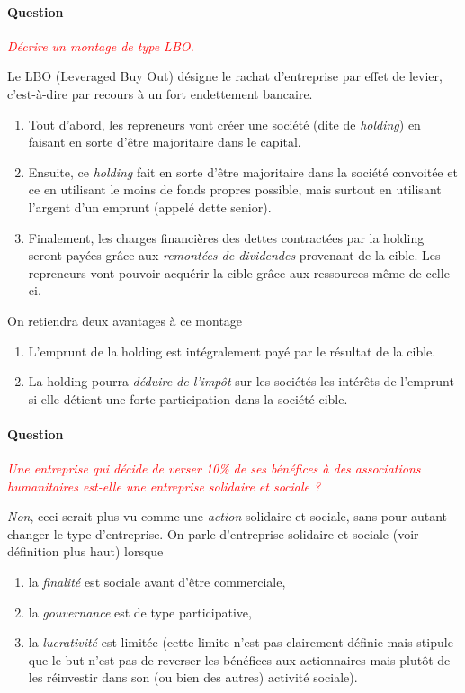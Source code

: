 \documentclass[12pt,oneside,a4paper]{article}
\newcommand{\question}[1]
{
\addtocounter{section}{1}
\paragraph*{Question \thesection}
\emph{\textcolor{red}{#1}}
}
\begin{document}
\question{Décrire un montage de type LBO.}
Le LBO (Leveraged Buy Out) désigne le rachat d'entreprise par effet de levier,
c'est-à-dire par recours à un fort endettement bancaire.
\begin{enumerate}
  \item Tout d'abord, les repreneurs vont créer une société (dite de \emph{holding})
  en faisant en sorte d'être majoritaire dans le capital.
  \item Ensuite, ce \emph{holding} fait en sorte d'être majoritaire dans la société
  convoitée et ce en utilisant le moins de fonds propres possible, mais surtout
  en utilisant l'argent d'un emprunt (appelé dette senior).
  \item Finalement, les charges financières des dettes contractées par la holding
  seront payées grâce aux \emph{remontées de dividendes} provenant de la cible. 
  Les repreneurs vont pouvoir acquérir la cible grâce aux ressources même de celle-ci.
\end{enumerate}
On retiendra deux avantages à ce montage
\begin{enumerate}
  \item L'emprunt de la holding est intégralement payé par le résultat de la cible.
  \item La holding pourra \emph{déduire de l’impôt} sur les sociétés les intérêts de 
  l’emprunt si elle détient une forte participation dans la société cible.
\end{enumerate}

\question{Une entreprise qui décide de verser 10\% de ses bénéfices à des associations
humanitaires est-elle une entreprise solidaire et sociale ?}
\emph{Non}, ceci serait plus vu comme une \emph{action} solidaire et sociale,
sans pour autant changer le type d'entreprise.
On parle d'entreprise solidaire et sociale (voir définition plus haut)
lorsque 
\begin{enumerate}
  \item la \emph{finalité} est sociale avant d'être commerciale,
  \item la \emph{gouvernance} est de type participative,
  \item la \emph{lucrativité} est limitée (cette limite n'est pas clairement définie
  mais stipule que le but n'est pas de reverser les bénéfices aux actionnaires
  mais plutôt de les réinvestir dans son (ou bien des autres) activité sociale).
\end{enumerate}
\end{document}

